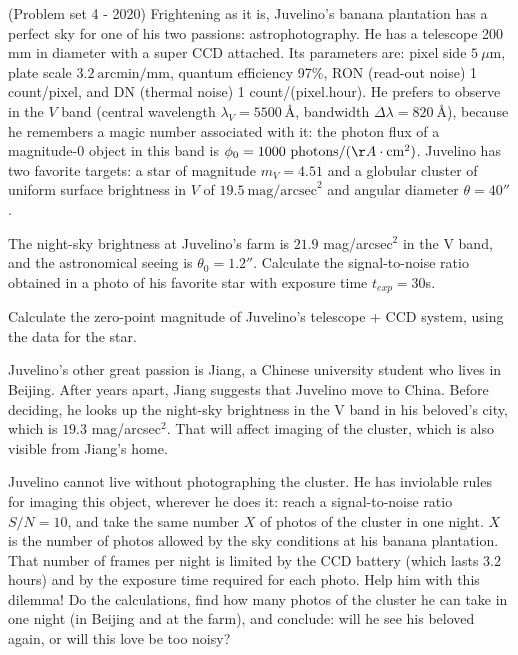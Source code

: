 \documentclass[11pt]{article}
\begin{document}
\begin{pproblem}
    (Problem set 4 - 2020) Frightening as it is, Juvelino's banana plantation has a perfect sky for one of his two passions: astrophotography. He has a telescope 200 mm in diameter with a super CCD attached. Its parameters are: pixel side \(5\ \mu\text{m}\), plate scale \(3.2\ \text{arcmin/mm}\), quantum efficiency 97\%, RON (read-out noise) 1 count/pixel, and DN (thermal noise) 1 count/(pixel.hour). He prefers to observe in the \(V\) band (central wavelength \(\lambda_V = 5500\ \text{Å}\), bandwidth \(\Delta \lambda = 820\ \text{Å}\)), because he remembers a magic number associated with it: the photon flux of a magnitude-0 object in this band is \(\phi_0 = 1000\ \text{photons/}(\AA\cdot \text{cm}^2)\). Juvelino has two favorite targets: a star of magnitude \(m_V = 4.51\) and a globular cluster of uniform surface brightness in \(V\) of \(19.5\ \text{mag/arcsec}^2\) and angular diameter \(\theta = 40''\).
\end{pproblem}

    \begin{alternativas}
        \item The night-sky brightness at Juvelino's farm is \(21.9\) mag/arcsec\(^2\) in the V band, and the astronomical seeing is \(\theta_0=1.2''\). Calculate the signal-to-noise ratio obtained in a photo of his favorite star with exposure time \(t_{exp}=30\)s.
        \item Calculate the zero-point magnitude of Juvelino's telescope + CCD system, using the data for the star.
        
        Juvelino's other great passion is Jiang, a Chinese university student who lives in Beijing. After years apart, Jiang suggests that Juvelino move to China. Before deciding, he looks up the night-sky brightness in the V band in his beloved's city, which is \(19.3\) mag/arcsec\(^2\). That will affect imaging of the cluster, which is also visible from Jiang's home.

        \item Juvelino cannot live without photographing the cluster. He has inviolable rules for imaging this object, wherever he does it: reach a signal-to-noise ratio $S/N=10$, and take the same number $X$ of photos of the cluster in one night. $X$ is the number of photos allowed by the sky conditions at his banana plantation. That number of frames per night is limited by the CCD battery (which lasts $3.2$ hours) and by the exposure time required for each photo. Help him with this dilemma! Do the calculations, find how many photos of the cluster he can take in one night (in Beijing and at the farm), and conclude: will he see his beloved again, or will this love be too noisy?
    \end{alternativas}
\end{document}
